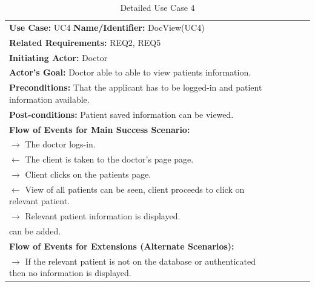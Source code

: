 \documentclass[a4paper]{article}
\begin{document}
\FloatBarrier

\begin{table}[h!]
\centering
\caption*{Detailed Use Case 4}
\label{DetailedUC2}
\begin{tabular}{|c|llll}
\cline{1-1}

\multicolumn{1}{|l|}{\textbf{Use Case:} UC4 \textbf{Name/Identifier:} DocView(UC4)} &  &  &  &  \\ \cline{1-1}

\multicolumn{1}{|l|}{\textbf{Related Requirements:} REQ2, REQ5} &  &  &  &  \\

\multicolumn{1}{|l|}{\textbf{Initiating Actor:} Doctor} &  &  &  &  \\

\multicolumn{1}{|l|}{\textbf{Actor’s Goal:} Doctor able to able to view patients information.} &  &  &  &  \\

\multicolumn{1}{|l|}{\textbf{Preconditions:} That the applicant has to be logged-in and patient information available.} &  &  &  &  \\

\multicolumn{1}{|l|}{\textbf{Post-conditions:} Patient saved information can be viewed.} &  &  &  &  \\

\multicolumn{1}{|l|}{\textbf{Flow of Events for Main Success Scenario:}} &  &  &  &  \\

\multicolumn{1}{|l|}{ $ \rightarrow $ The doctor logs-in.} &  &  &  &  \\

\multicolumn{1}{|l|}{ $ \leftarrow $ The client is taken to the doctor's page page.} &  &  &  &  \\

\multicolumn{1}{|l|}{ $ \rightarrow $ Client clicks on the patients page.} &  &  &  &  \\

\multicolumn{1}{|l|}{ $ \leftarrow $ View of all patients can be seen, client proceeds to click on relevant patient. } &  &  &  &  \\

\multicolumn{1}{|l|}{ $ \rightarrow $ Relevant patient information is displayed.} &  &  &  &  \\

\multicolumn{1}{|l|}{can be added.} &  &  &  &  \\

\multicolumn{1}{|l|}{\textbf{Flow of Events for Extensions (Alternate Scenarios):}} &  &  &  &  \\

\multicolumn{1}{|l|}{ $ \rightarrow $ If the relevant patient is not on the database or authenticated then no information is displayed.} &  &  &  &  \\ \cline{1-1}

\end{tabular}
\end{table}
\end{document}
